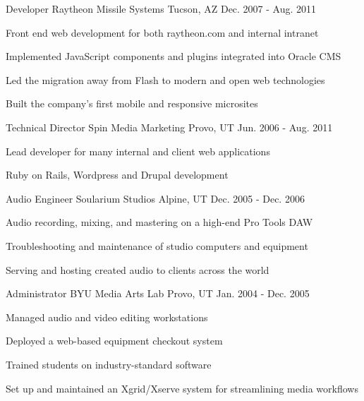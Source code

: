 \begin{cventries}
  \cventry
    {Developer} %
    {Raytheon Missile Systems} %
    {Tucson, AZ} %
    {Dec. 2007 - Aug. 2011} %
    {
      \begin{cvitems} %
        \item {Front end web development for both raytheon.com and internal intranet}
        \item {Implemented JavaScript components and plugins integrated into Oracle CMS}
        \item {Led the migration away from Flash to modern and open web technologies}
        \item {Built the company’s first mobile and responsive microsites}
      \end{cvitems}
    }

  \cventry
    {Technical Director} %
    {Spin Media Marketing} %
    {Provo, UT} %
    {Jun. 2006 - Aug. 2011} %
    {
      \begin{cvitems} %
        \item {Lead developer for many internal and client web applications}
        \item {Ruby on Rails, Wordpress and Drupal development}
      \end{cvitems}
    }

  \cventry
    {Audio Engineer} %
    {Soularium Studios} %
    {Alpine, UT} %
    {Dec. 2005 - Dec. 2006} %
    {
      \begin{cvitems} %
        \item {Audio recording, mixing, and mastering on a high-end Pro Tools DAW}
        \item {Troubleshooting and maintenance of studio computers and equipment}
        \item {Serving and hosting created audio to clients across the world}
      \end{cvitems}
    }

  \cventry
    {Administrator} %
    {BYU Media Arts Lab} %
    {Provo, UT} %
    {Jan. 2004 - Dec. 2005} %
    {
      \begin{cvitems} %
        \item {Managed audio and video editing workstations}
        \item {Deployed a web-based equipment checkout system}
        \item {Trained students on industry-standard software}
        \item {Set up and maintained an Xgrid/Xserve system for streamlining media workflows}
      \end{cvitems}
    }

\end{cventries}

